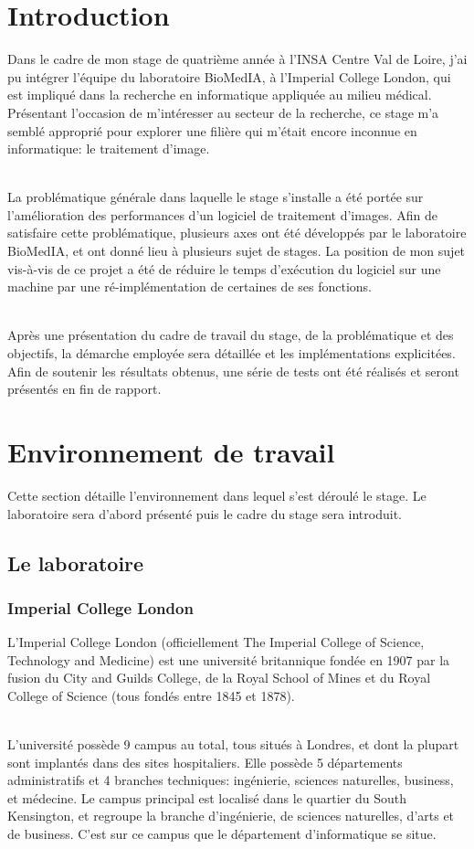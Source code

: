 \documentclass[10pt]{report}
\begin{document}
\chapter*{Introduction}
Dans le cadre de mon stage de quatrième année à l'INSA Centre Val de Loire, j'ai pu intégrer l'équipe du laboratoire BioMedIA, à l'Imperial College London, qui est impliqué dans la recherche en informatique appliquée au milieu médical. Présentant l'occasion de m'intéresser au secteur de la recherche, ce stage m'a semblé approprié pour explorer une filière qui m'était encore inconnue en informatique: le traitement d'image.\\ ~\par  \noindent
La problématique générale dans laquelle le stage s'installe a été portée sur l'amélioration des performances d'un logiciel de traitement d'images. Afin de satisfaire cette problématique, plusieurs axes ont été développés par le laboratoire BioMedIA, et ont donné lieu à plusieurs sujet de stages. La position de mon sujet vis-à-vis de ce projet a été de réduire le temps d'exécution du logiciel sur une machine par une ré-implémentation de certaines de ses fonctions. \\ ~\par
\noindent
Après une présentation du cadre de travail du stage, de la problématique et des objectifs, la démarche employée sera détaillée et les implémentations explicitées. Afin de soutenir les résultats obtenus, une série de tests ont été réalisés et seront présentés en fin de rapport.
\chapter{Environnement de travail} 
	Cette section détaille l'environnement dans lequel s'est déroulé le stage. Le laboratoire sera d'abord présenté puis le cadre du stage sera introduit.
	\section{Le laboratoire}
	
	\subsection{Imperial College London} 
	L’Imperial College London (officiellement The Imperial College of Science, Technology and Medicine) est une université britannique fondée en 1907 par la fusion du City and Guilds College, de la Royal School of Mines et du Royal College of Science (tous fondés entre 1845 et 1878).\\ ~\par
    L'université possède 9 campus au total, tous situés à Londres, et dont la plupart sont implantés dans des sites hospitaliers.  
    Elle possède 5 départements administratifs et 4 branches techniques: ingénierie, sciences naturelles, business, et médecine.	Le campus principal est localisé dans le quartier du South Kensington, et regroupe la branche d'ingénierie, de sciences naturelles, d'arts et de business. C'est sur ce campus que le département d'informatique se situe. 
    
\end{document}
